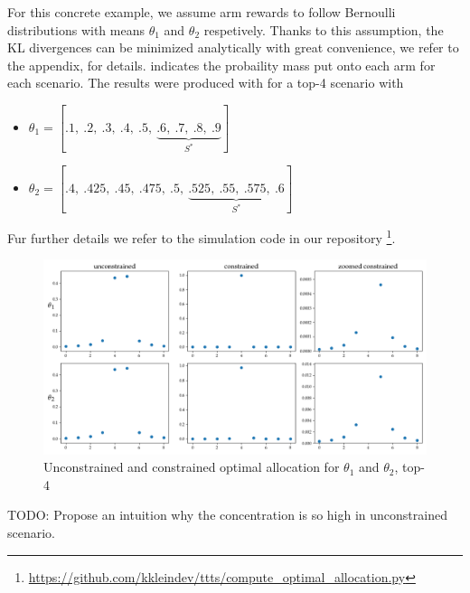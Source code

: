 For this concrete example, we assume arm rewards to follow Bernoulli distributions with means $\theta_1$ and $\theta_2$ respetively. Thanks to this assumption, the KL divergences can be minimized analytically with great convenience, we refer to the appendix,  for details.  indicates the probaility mass put onto each arm for each scenario. The results were produced with for a top-4 scenario with
\begin{itemize}
  \item $\theta_1 = [.1,\ .2,\ .3,\ .4,\ .5,\ \underbrace{.6,\ .7,\ .8,\ .9}_\text{$S^*$}]$
  \item $\theta_2 = [.4,\ .425,\ .45,\ .475,\ .5,\ \underbrace{.525,\ .55,\ .575,\ .6}_\text{$S^*$}]$
\end{itemize}

Fur further details we refer to the simulation code in our repository \footnote{\url{https://github.com/kkleindev/ttts/compute_optimal_allocation.py}}.

\begin{figure}[h]
  \centering
  \includegraphics[width=\textwidth]{optimal_allocation.png}
  \caption{Unconstrained and constrained optimal allocation for $\theta_1$ and $\theta_2$, top-4}
  \label{fig:optimal_allocation}
\end{figure}

TODO: Propose an intuition why the concentration is so high in unconstrained scenario.

